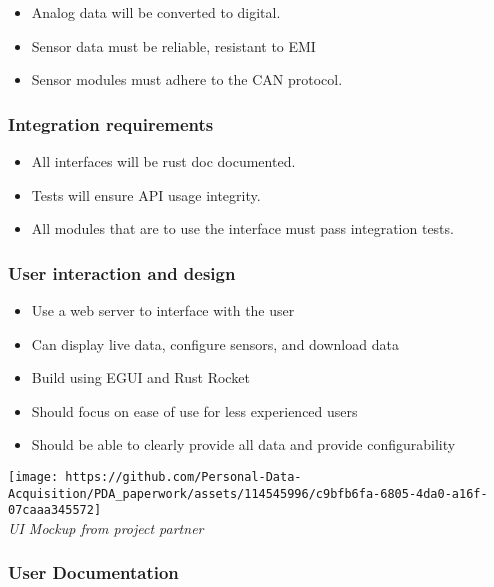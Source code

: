 \begin{itemize}
\tightlist
\item
  Analog data will be converted to digital.
\item
  Sensor data must be reliable, resistant to EMI
\item
  Sensor modules must adhere to the CAN protocol.
\end{itemize}

\hypertarget{integration-requirements}{%
\subsubsection{Integration
requirements}\label{integration-requirements}}

\begin{itemize}
\tightlist
\item
  All interfaces will be rust doc documented.
\item
  Tests will ensure API usage integrity.
\item
  All modules that are to use the interface must pass integration tests.
\end{itemize}

\hypertarget{user-interaction-and-design}{%
\subsubsection{User interaction and
design}\label{user-interaction-and-design}}

\begin{itemize}
\tightlist
\item
  Use a web server to interface with the user
\item
  Can display live data, configure sensors, and download data
\item
  Build using EGUI and Rust Rocket
\item
  Should focus on ease of use for less experienced users
\item
  Should be able to clearly provide all data and provide configurability
\end{itemize}

\texttt{[image: https://github.com/Personal-Data-Acquisition/PDA\_paperwork/assets/114545996/c9bfb6fa-6805-4da0-a16f-07caaa345572]}\\
\emph{UI Mockup from project partner}

\hypertarget{user-documentation}{%
\subsubsection{User Documentation}\label{user-documentation}}

